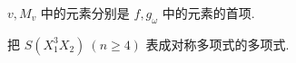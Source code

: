 \documentclass[UTF8]{ctexart}
\begin{document}




$v,M_v$ 中的元素分别是 $f,g_\omega$ 中的元素的首项.
\begin{example}
    把 $S(X_1^3X_2)\ (n\geq4)$ 表成对称多项式的多项式.
\end{example}
\end{document}
